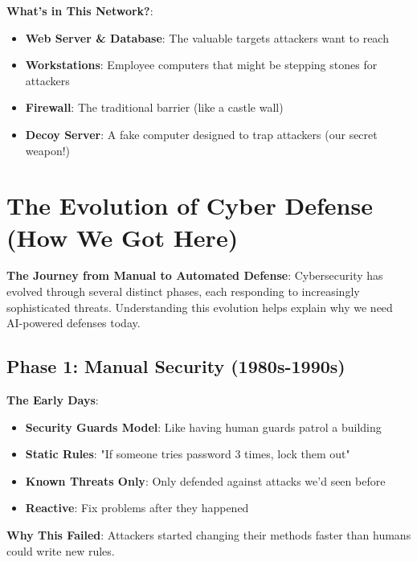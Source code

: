 \documentclass[11pt]{article}
\begin{document}

\begin{example}
\textbf{What's in This Network?}:
\begin{itemize}
\item \textbf{Web Server \& Database}: The valuable targets attackers want to reach
\item \textbf{Workstations}: Employee computers that might be stepping stones for attackers
\item \textbf{Firewall}: The traditional barrier (like a castle wall)
\item \textbf{Decoy Server}: A fake computer designed to trap attackers (our secret weapon!)
\end{itemize}
\end{example}

\section{The Evolution of Cyber Defense (How We Got Here)}

\begin{foundation}
\textbf{The Journey from Manual to Automated Defense}: Cybersecurity has evolved through several distinct phases, each responding to increasingly sophisticated threats. Understanding this evolution helps explain why we need AI-powered defenses today.
\end{foundation}

\subsection{Phase 1: Manual Security (1980s-1990s)}

\begin{intuition}
\textbf{The Early Days}: 
\begin{itemize}
\item \textbf{Security Guards Model}: Like having human guards patrol a building
\item \textbf{Static Rules}: "If someone tries password 3 times, lock them out"
\item \textbf{Known Threats Only}: Only defended against attacks we'd seen before
\item \textbf{Reactive}: Fix problems after they happened
\end{itemize}

\textbf{Why This Failed}: Attackers started changing their methods faster than humans could write new rules.
\end{intuition}
\end{document}
